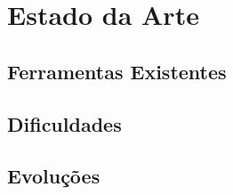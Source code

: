\chapter{Estado da Arte}
\lipsum[1-4]

\section{Ferramentas Existentes}
\lipsum[1-4]

\section{Dificuldades}
\lipsum[1-4]

\section{Evoluções}
\lipsum[1-4]
